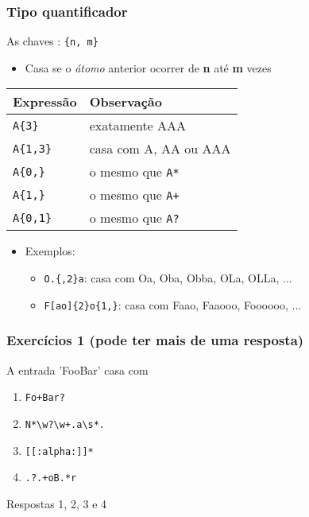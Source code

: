\documentclass{beamer}
\begin{document}
\begin{frame}
 \frametitle{Tipo quantificador}
 \begin{block}{As chaves : \texttt{\{n, m\}}}
  \begin{itemize}
   \item Casa se o \textit{átomo} anterior ocorrer de \textbf{n} até \textbf{m} vezes
  \end{itemize}
  \pause
  \begin{center}
   \begin{tabular}{|l|l|}
	\hline
	\textbf{Expressão} & \textbf{Observação} \\
	\hline
	\texttt{A\{3\}} & exatamente AAA \\
	\hline
	\texttt{A\{1,3\}} & casa com A, AA ou AAA \\
	\hline
	\texttt{A\{0,\}} & o mesmo que \texttt{A*} \\
	\hline
	\texttt{A\{1,\}} & o mesmo que \texttt{A+} \\
	\hline
	\texttt{A\{0,1\}} & o mesmo que \texttt{A?} \\
	\hline
   \end{tabular}
  \end{center}

  \pause
  \begin{itemize}
   \item Exemplos:
	\begin{itemize}
	 \item \texttt{O.\{,2\}a}: casa com Oa, Oba, Obba, OLa, OLLa, ...
	  \pause
	 \item \texttt{F[ao]\{2\}o\{1,\}}: casa com Faao, Faaooo, Foooooo, ...
	\end{itemize}
  \end{itemize}
 \end{block}
\end{frame}

\begin{frame}[fragile]
 \frametitle{Exercícios 1 (pode ter mais de uma resposta)}
 \begin{block}{A entrada 'FooBar' casa com}
  \begin{enumerate}
   \item \texttt{Fo+Bar?}
   \item \verb=N*\w?\w+.a\s*.=
   \item \texttt{[[:alpha:]]*}
   \item \texttt{.?.+oB.*r}
  \end{enumerate}
 \end{block}

 \pause
 \begin{block}{Respostas}
  1, 2, 3 e 4
 \end{block}
\end{frame}
\end{document}
